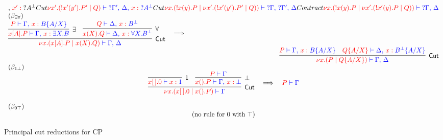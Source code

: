 \begin{figure*}
\[\begin{array}{c}
{{{{{                                  \comma \tmof{x'}{?\dualbt{A}}}
      }{Cut}{
        \tm{\nu x'\Of{!A}.(!x'(y').P' \mid Q)}
          \tpvdash \tp{{?\Gamma'} \comma \Delta \comma \tmof{x}{?\dualbt{A}}}
      }
    }{Cut}{
      \tm{\nu x\Of{!A}.(!x(y).P \mid \nu x'\Of{!A}.(!x'(y').P' \mid Q))}
        \tpvdash \tp{{?\Gamma} \comma {?\Gamma'} \comma \Delta}
    }
  }{Contract}{
    \tm{\nu x\Of{!A}.(!x(y).P \mid \nu x'\Of{!A}.(!x'(y).P \mid Q))}
      \tpvdash \tp{{?\Gamma} \comma \Delta}
  }
}
\\
\multicolumn{1}{l}{(\beta_{\exists\forall})} \\ %
\vcenter{
  \inference{
    \inference{
      \tm{P} \tpvdash \tp{\Gamma \comma \tmof{x}B\sub{A/X}}
    }{\exists}{
      \tm{x[A].P} \tpvdash \tp{\Gamma \comma \tmof{x}\any{X}B}
    } 
    &
    \inference{
      \tm{Q} \tpvdash \tp{\Delta \comma \tmof{x}\dualbt{B}}
    }{\forall}{
      \tm{x(X).Q} \tpvdash \tp{\Delta \comma \tmof{x}\all{X}\dualbt{B}}
    } 
  }{Cut}{
   \tm{\nu x \Of{\any{X}B}.(x[A].P \mid x(X).Q)} \tpvdash
     \tp{\Gamma \comma \Delta}
  }
} \quad \becomes \hfill
\\
\hfill
\vcenter{
  \inference{
    \tm{P} \tpvdash \tp{\Gamma \comma \tmof{x}B\sub{A/X}}
    &
    \tm{Q\sub{A/X}} \tpvdash \tp{\Delta \comma \tmof{x}\dualbt{B}\sub{A/X}}
  }{Cut}{
    \tm{\nu x \Of{B\sub{A/X}}.(P \mid Q\sub{A/X})} \tpvdash
      \tp{\Gamma \comma \Delta}
  }
}
\\
\multicolumn{1}{l}{(\beta_{1\bot})} \\ %
\vcenter{\inference{
  \inference{}{1}{
    \tm{x[\,].0} \tpvdash \tp{\tmof{x}1}
  }
  &
  \inference{
    \tm{P} \tpvdash \tp{\Gamma}
  }{\bot}{
    \tm{x().P} \tpvdash \tp{\Gamma \comma \tmof{x}\bot}
  } 
}{Cut}{
  \tm{\nu x\Of{1}.(x[\,].0 \mid x().P)} \tpvdash \tp{\Gamma}
}}
\quad \becomes \quad
\tm{P} \tpvdash \tp{\Gamma}
\\~\\
\multicolumn{1}{l}{(\beta_{0\top})} \\%
\textrm{(no rule for $0$ with $\top$)}
\end{array}\]
\caption{Principal cut reductions for CP}
\label{fig:principal}
\end{figure*}
